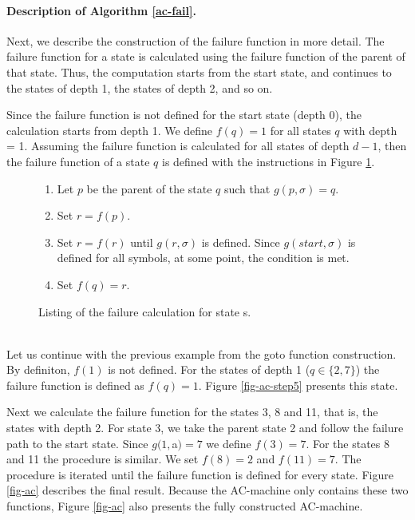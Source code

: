 \documentclass[english,twoside,censored,csm,algorithms-track-2020]{HYthesisML}
\theoremstyle{plain}
\theoremstyle{definition}
\begin{document}
  \paragraph{Description of Algorithm \ref{ac-fail}.}  
  Next, we describe the construction of the failure function in more detail. The failure function
  for a state is calculated using the failure function of the parent of that state. Thus, the computation
  starts from the start state, and continues to the states of depth 1, the states of depth 2, and so on.

  Since the failure function is not defined for the start state (depth 0), the calculation starts
  from depth 1. We define $f(q)=1$ for all states $q$ with depth = 1. Assuming the failure function is
  calculated for all states of depth $d-1$, then the failure function of a state $q$ is defined with the
  instructions in Figure \ref{lst-failure-calculation}.
  
  \begin{figure}[b]
  \begin{enumerate}
  \item Let $p$ be the parent of the state $q$ such that $g(p,\sigma) = q$.
  \item Set $r = f(p)$.
  \item Set $r = f(r)$ until $g(r,\sigma)$ is defined. Since $g(start,\sigma)$ is defined
    for all symbols, at some point, the condition is met.
  \item Set $f(q) = r$.
  \end{enumerate}
   \caption{Listing of the failure calculation for state s.} \label{lst-failure-calculation}    
  \end{figure}

  \begin{testexample}[]~\label{exmp-fail}\\
    Let us continue with the previous example from the goto function construction. By definiton, $f(1)$
    is not defined. For the states of depth 1 ($q\in\{2,7\}$) the failure function is defined as
    $f(q)=1$. Figure \ref{fig-ac-step5} presents this state.

  Next we calculate the failure function for the states 3, 8 and 11, that is, the states with depth 2.
  For state 3, we take the parent state 2 and follow the failure path to the start state. Since
  $g(1,$a$) = 7$ we define $f(3)=7$. For the states 8 and 11 the procedure is similar. We set 
  $f(8)=2$ and $f(11)=7$. The procedure is iterated until the failure function is defined for every
  state. Figure \ref{fig-ac} describes the final result. Because the AC-machine only contains these
  two functions, Figure \ref{fig-ac} also presents the fully constructed AC-machine.
  \end{testexample}
\end{document}
